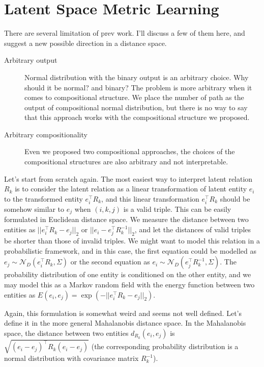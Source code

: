\documentclass{article}
\theoremstyle{definition}
\begin{document}
\section{Latent Space Metric Learning}

There are several limitation of prev work. I'll discuss a few of them here, and suggest a new possible direction in a distance space.
\begin{description}
\item[Arbitrary output] Normal distribution with the binary output is an arbitrary choice. Why should it be normal? and binary? The problem is more arbitrary when it comes to compositional structure. We place the number of path as the output of compositional normal distribution, but there is no way to say that this approach works with the compositional structure we proposed.
\item[Arbitrary compositionality] Even we proposed two compositional approaches, the choices of the compositional structures are also arbitrary and not interpretable.
\end{description}

Let's start from scratch again. The most easiest way to interpret latent relation $R_k$ is to consider the latent relation as a linear transformation of latent entity $e_i$ to the transformed entity $e_i^\top R_k$, and this linear transformation $e_i^\top R_k$ should be somehow similar to $e_j$ when $(i, k, j)$ is a valid triple. This can be easily formulated in Euclidean distance space. We measure the distance between two entities as $|| e_i^\top R_k - e_j ||_2$ or $|| e_i - e_j^\top R_k^{-1} ||_2$, and let the distances of valid triples be shorter than those of invalid triples. We might want to model this relation in a probabilistic framework, and in this case, the first equation could be modelled as $e_j \sim \mathcal{N}_D(e_i^\top R_k, \Sigma)$ or the second equation as $e_i \sim \mathcal{N}_D(e_j^\top R_k^{-1}, \Sigma)$. The probability distribution of one entity is conditioned on the other entity, and we may model this as a Markov random field with the energy function between two entities as $E(e_i, e_j) = \exp(-||e_i^\top R_k - e_j||_2)$.

Again, this formulation is somewhat weird and seems not well defined. Let's define it in the more general Mahalanobis distance space. In the Mahalanobis space, the distance between two entities $d_{R_k}(e_i, e_j)$ is $\sqrt{(e_i-e_j)^\top R_k (e_i - e_j)}$ (the corresponding probability distribution is a normal distribution with covariance matrix $R_k^{-1}$). 
\end{document}
